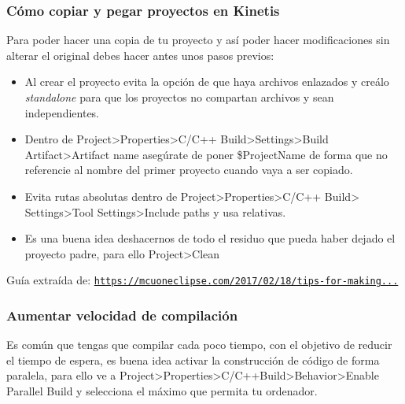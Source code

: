 \subsubsection{Cómo copiar y pegar proyectos en Kinetis}
Para poder hacer una copia de tu proyecto y así poder hacer modificaciones sin alterar el original debes hacer antes unos pasos previos:
\begin{itemize}
\tightlist
\item
	Al crear el proyecto evita la opción de que haya archivos enlazados y creálo \textit{standalone} para que los proyectos no compartan archivos y sean independientes.
\item
	Dentro de Project>Properties>C/C++ Build>Settings>Build Artifact>Artifact name asegúrate de poner \${ProjectName} de forma que no referencie al nombre del primer proyecto cuando vaya a ser copiado.
\item
	Evita rutas absolutas dentro de Project>Properties>C/C++ Build> Settings>Tool Settings>Include paths y usa relativas.
\item
	Es una buena idea deshacernos de todo el residuo que pueda haber dejado el proyecto padre, para ello Project>Clean
\end{itemize}
Guía extraída de: \href{https://mcuoneclipse.com/2017/02/18/tips-for-making-copy-of-eclipse-cdt-projects-easier/#more-20572}{\texttt{https://mcuoneclipse.com/2017/02/18/tips-for-making...}}

\subsubsection{Aumentar velocidad de compilación}
Es común que tengas que compilar cada poco tiempo, con el objetivo de reducir el tiempo de espera, es buena idea activar la construcción de código de forma paralela, para ello ve a Project>Properties>C/C++Build>Behavior>Enable Parallel Build y selecciona el máximo que permita tu ordenador.